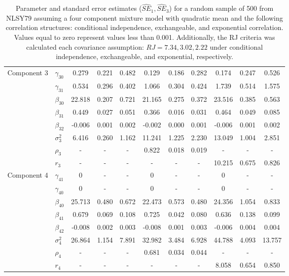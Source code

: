 \documentclass[10pt]{article}
\begin{document}
\begin{table}[ht]
\begin{center}
\begin{tabular}{llccccccccc}
  Component 3 & $\gamma_{30}$ & 0.279 & 0.221 & 0.482 & 0.129 & 0.186 & 0.282 & 0.174 & 0.247 & 0.526 \\ 
    & $\gamma_{31}$ & 0.534 & 0.296 & 0.402 & 1.066 & 0.304 & 0.424 & 1.739 & 0.514 & 1.575 \\ 
    & $\beta_{30}$ & 22.818 & 0.207 & 0.721 & 21.165 & 0.275 & 0.372 & 23.516 & 0.385 & 0.563 \\ 
    & $\beta_{31}$ & 0.449 & 0.027 & 0.051 & 0.366 & 0.016 & 0.031 & 0.464 & 0.049 & 0.085 \\ 
    & $\beta_{32}$ & -0.006 & 0.001 & 0.002 & -0.002 & 0.000 & 0.001 & -0.006 & 0.001 & 0.002 \\ 
    & $\sigma_3^2$ & 6.416 & 0.260 & 1.162 & 11.241 & 1.225 & 2.230 & 13.049 & 1.004 & 2.851 \\ 
    & $\rho_3$ & - & - & - & 0.822 & 0.018 & 0.019 & - & - & - \\ 
    & $r_3$ & - & - & - & - & - & - & 10.215 & 0.675 & 0.826 \\ 
  Component 4 & $\gamma_{41}$ & 0 & - & - & 0 & - & - & 0 & - & - \\ 
    & $\gamma_{40}$ & 0 & - & - & 0 & - & - & 0 & - & - \\ 
    & $\beta_{40}$ & 25.713 & 0.480 & 0.672 & 22.473 & 0.573 & 0.480 & 24.356 & 1.054 & 0.833 \\ 
    & $\beta_{41}$ & 0.679 & 0.069 & 0.108 & 0.725 & 0.042 & 0.080 & 0.636 & 0.138 & 0.099 \\ 
    & $\beta_{42}$ & -0.008 & 0.002 & 0.003 & -0.008 & 0.001 & 0.003 & -0.006 & 0.004 & 0.004 \\ 
    & $\sigma_4^2$ & 26.864 & 1.154 & 7.891 & 32.982 & 3.484 & 6.928 & 44.788 & 4.093 & 13.757 \\ 
    & $\rho_4$ & - & - & - & 0.681 & 0.034 & 0.044 & - & - & - \\ 
    & $r_4$ & - & - & - & - & - & - & 8.058 & 0.654 & 0.850 \\ 
   \hline\end{tabular}
\caption{Parameter and standard error estimates ($\widehat{SE}_{1},\widehat{SE}_{3}$) for a random sample of 500 from NLSY79 assuming a four component mixture model with quadratic mean and the following correlation structures: conditional independence, exchangeable, and exponential correlation. Values equal to zero represent values less than 0.001. Additionally, the RJ criteria was calculated each covariance assumption: $RJ=7.34, 3.02, 2.22$ under conditional independence, exchangeable, and exponential, respectively.}
\label{tab:dat}
\end{center}
\end{table}
\end{document}
